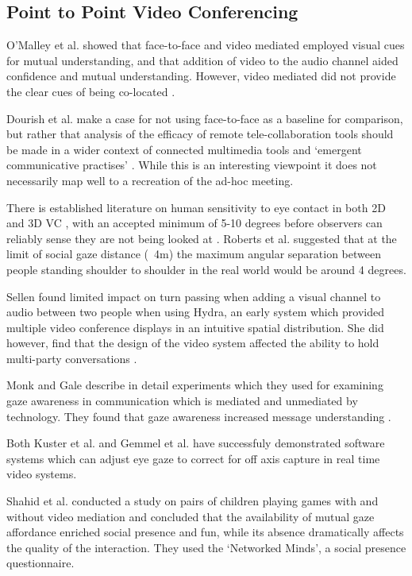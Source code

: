             \subsection{Point to Point Video Conferencing}
                O'Malley et al. showed that face-to-face and video mediated employed  visual cues for mutual understanding, and that addition of video to the audio channel aided confidence and mutual understanding. However, video mediated did not provide the clear cues of being co-located \cite{OMalley1996}.\par
                Dourish et al. make a case for not using face-to-face as a baseline for comparison, but rather that analysis of the efficacy of remote tele-collaboration tools should be made in a wider context of connected multimedia tools and `emergent communicative practises' \cite{Dourish1996}. While this is an interesting viewpoint it does not necessarily map well to a recreation of the ad-hoc meeting.\par
There is established literature on human sensitivity to eye contact in both 2D and 3D VC \cite{Criminisi2003, Van_Eijk2010}, with an accepted minimum of 5-10 degrees before observers can reliably sense they are not being looked at \cite{Chen2002}. Roberts et al. suggested that at the limit of social gaze distance (~4m) the maximum angular separation between people standing shoulder to shoulder in the real world would be around 4 degrees\cite{Roberts2013}. \par
                Sellen found limited impact on turn passing when adding a visual channel to audio between two people when using Hydra, an early system which provided multiple video conference displays in an intuitive spatial distribution\cite{Sellen1992}. She did however, find that the design of the video system affected the ability to hold multi-party conversations \cite{Sellen1995}.\par
                Monk and Gale describe in detail experiments which they used 
 for examining gaze awareness in communication which is mediated and unmediated by technology.  
  They   found that gaze awareness increased message understanding  
  \cite{Monk2002}.\par
                Both Kuster et al. and Gemmel et al. have successfuly demonstrated software systems which can adjust eye gaze to correct for off axis capture in real time video systems\cite{Gemmell2000, Kuster2012}.\par
                Shahid et al. conducted a study on pairs of children playing games with and without video mediation and concluded that the availability of mutual gaze affordance enriched social presence and fun, while its absence dramatically affects the quality of the interaction. They used the `Networked Minds', a social presence questionnaire.                
